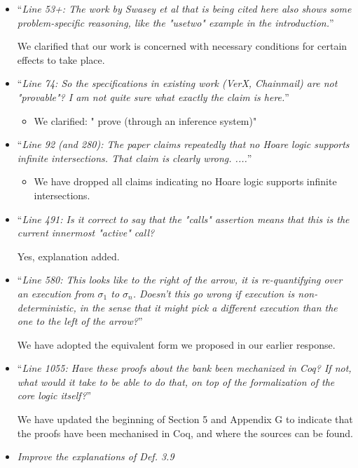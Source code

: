 \documentclass[11pt]{amsart}
\begin{document}
\begin{itemize}
\begin{itemize}
\item
``\emph{Line 53+: The work by Swasey et al that is being cited here also shows some problem-specific reasoning, like the "usetwo" example in the introduction.}''

We clarified that our work is concerned with necessary conditions for certain effects to take place. 
\item
``\emph{Line 74: So the specifications in existing work (VerX, Chainmail) are not "provable"? I am not quite sure what exactly the claim is here.}''

\begin{itemize}
\item
We clarified: " prove
(through an inference system)"
\end{itemize}

\item
``\emph{Line 92 (and 280): The paper claims repeatedly that no Hoare logic supports infinite intersections. That claim is clearly wrong. ....}''
\begin{itemize}
\item
We have dropped all claims indicating no Hoare logic supports infinite intersections.
\end{itemize}
\item
``\emph{Line 491: Is it correct to say that the "calls" assertion means that this is the current innermost "active" call?}

Yes, explanation added.

\item
``\emph{Line 580: This looks like to the right of the arrow, it is re-quantifying over an execution from $\sigma_1$ to $\sigma_n$. Doesn't this go wrong if execution is non-deterministic, in the sense that it might pick a different execution than the one to the left of the arrow?}''
 
We have adopted the equivalent form we proposed in our earlier response. 
 
\item
``\emph{Line 1055: Have these proofs about the bank been mechanized in Coq? If not, what would it take to be able to do that, on top of the formalization of the core logic itself?}''
 
We have updated the beginning of Section 5 and Appendix G to indicate that the proofs have been mechanised in Coq, and where the sources can be found.
 
 

\item
\emph{Improve the explanations of Def. 3.9}


\end{itemize}
\end{itemize}
\end{document}
